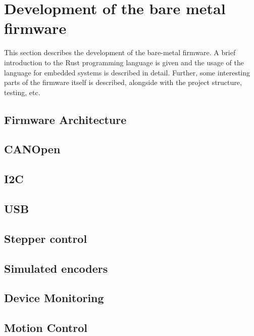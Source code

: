 \section{Development of the bare metal firmware}
\label{sec:firmware}
This section describes the development of the bare-metal firmware.
A brief introduction to the Rust programming language is given and the usage of the language for embedded systems is described in detail.
Further, some interesting parts of the firmware itself is described, alongside with the project structure, testing, etc.

\subsection{Firmware Architecture} %
\subsection{CANOpen}
\subsection{I2C}
\subsection{USB}
\subsection{Stepper control} %
\subsection{Simulated encoders}
\subsection{Device Monitoring}
\subsection{Motion Control} %
